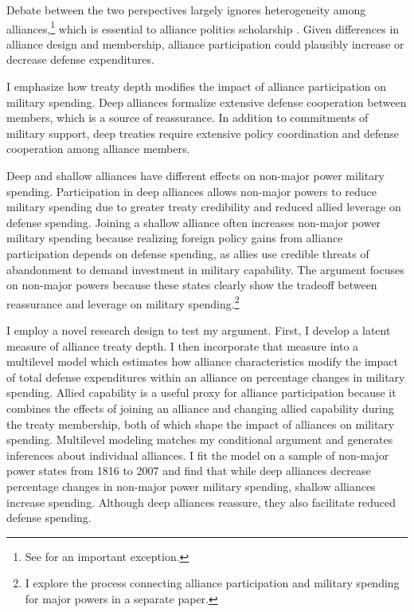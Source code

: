\documentclass[12pt]{article}
\begin{document}
Debate between the two perspectives largely ignores heterogeneity among alliances,\footnote{See \citet{DigiuseppePoast2016} for an important exception.} which is essential to alliance politics scholarship \citep{Morrow1991, Leeds2003, LeedsAnac2005, Fordham2010, Mattes2012, Benson2012, Poast2013, Johnsonetal2015}.  
Given differences in alliance design and membership, alliance participation could plausibly increase or decrease defense expenditures. 


I emphasize how treaty depth modifies the impact of alliance participation on military spending. 
Deep alliances formalize extensive defense cooperation between members, which is a source of reassurance. 
In addition to commitments of military support, deep treaties require extensive policy coordination and defense cooperation among alliance members. 


Deep and shallow alliances have different effects on non-major power military spending. 
Participation in deep alliances allows non-major powers to reduce military spending due to greater treaty credibility and reduced allied leverage on defense spending. 
Joining a shallow alliance often increases non-major power military spending because realizing foreign policy gains from alliance participation depends on defense spending, as allies use credible threats of abandonment to demand investment in military capability.
The argument focuses on non-major powers because these states clearly show the tradeoff between reassurance and leverage on military spending.\footnote{I explore the process connecting alliance participation and military spending for major powers in a separate paper.} 
 

I employ a novel research design to test my argument.
First, I develop a latent measure of alliance treaty depth. 
I then incorporate that measure into a multilevel model which estimates how alliance characteristics modify the impact of total defense expenditures within an alliance on percentage changes in military spending.
Allied capability is a useful proxy for alliance participation because it combines the effects of joining an alliance and changing allied capability during the treaty membership, both of which shape the impact of alliances on military spending. 
Multilevel modeling matches my conditional argument and generates inferences about individual alliances. 
I fit the model on a sample of non-major power states from 1816 to 2007 and find that while deep alliances decrease percentage changes in non-major power military spending, shallow alliances increase spending.
Although deep alliances reassure, they also facilitate reduced defense spending. 
\end{document}
